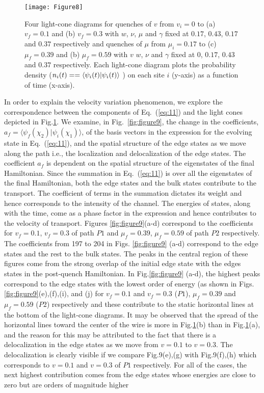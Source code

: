 \documentclass[aps,pra,reprint,superscriptaddress,longbibliography]{revtex4-2}
\begin{document}
\begin{figure}
	\centering
	\texttt{[image: Figure8]}
	\caption{Four light-cone diagrams for quenches of $v$ from $v_i=0$ to (a) $v_f=0.1$ and (b) $v_f=0.3$ with $w$, $\nu$, $\mu$ and $\gamma$ fixed at $0.17$, $0.43$, $0.17$ and $0.37$ respectively and quenches of $\mu$ from $\mu_i=0.17$ to (c) $\mu_f=0.39$ and (b) $\mu_f=0.59$ with $v$ $w$, $\nu$ and $\gamma$ fixed at $0$, $0.17$, $0.43$ and $0.37$ respectively. Each light-cone diagram plots the probability density ($n_i(t)== \bra{\psi_{i}(t)}\ket{\psi_{i}(t)}$ ) on each site $i$ (y-axis) as a function of time (x-axis).}
	\label{fig:figure8}
	\vspace{-0.5cm}
\end{figure}

In order to explain the velocity variation phenomenon, we explore the correspondence between the components of Eq.~(\ref{eq:11}) and the light cones depicted in Fig.\ref{fig:figure8}. We examine, in Fig.~\ref{fig:figure9}, the change in the coefficients, $a_f=\langle \psi_f(\chi_2)|\psi_i(\chi_1)\rangle$, of the basis vectors in the expression for the evolving state in Eq.~(\ref{eq:11}),  and the spatial structure of the edge states as we move along the path i.e., the localization and delocalization of the edge states. The coefficient $ a_f $ is dependent on the spatial structure of the eigenstates of the final Hamiltonian. Since the summation in Eq.~(\ref{eq:11}) is over all the eigenstates of the final Hamiltonian, both the edge states and the bulk states contribute to the transport. The coefficient of terms in the summation dictates its weight and hence corresponds to the intensity of the channel. The energies of states, along with the time, come as a phase factor in the expression and hence contributes to the velocity of transport. Figures \ref{fig:figure9}(a-d)  correspond to the coefficients for $v_f=0.1 $, $ v_f=0.3 $ of path $ P1 $ and $ \mu_f = 0.39 $, $ \mu_f = 0.59 $ of path $ P2 $ respectively. The coefficients from 197 to 204 in Figs. \ref{fig:figure9} (a-d) correspond to the edge states and the rest to the bulk states. The peaks in the central region of these figures come from the strong overlap of the initial edge state with the edges states in the post-quench Hamiltonian. In Fig.\ref{fig:figure9} (a-d), the highest peaks correspond to the edge states with the lowest order of energy (as shown in Figs.\ref{fig:figure9}(e),(f),(i), and (j) for $ v_f=0.1 $ and $ v_f=0.3$ ($P1$), $ \mu_f = 0.39 $ and $ \mu_f = 0.59 $ ($P2$) respectively and these contribute to the static horizontal lines at the bottom of the light-cone diagrams. It may be observed that the spread of the horizontal lines toward the center of the wire is more in Fig.\ref{fig:figure8}(b) than in Fig.\ref{fig:figure8}(a), and the reason for this may be attributed to the fact that there is a delocalization in the edge states as we move from $ v=0.1 $ to $ v=0.3 $. The delocalization is clearly visible if we compare Fig.9(e),(g) with Fig.9(f),(h) which corresponds to $ v=0.1 $ and $ v=0.3 $ of $ P1 $ respectively. For all of the cases, the next highest contribution comes from the edge states whose energies are close to zero but are orders of magnitude higher 
\end{document}
